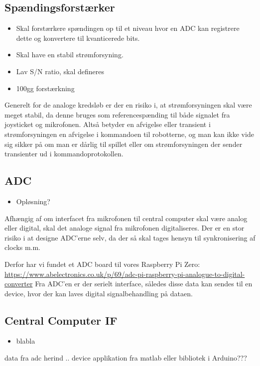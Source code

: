 \subsection{Spændingsforstærker}
\begin{itemize}
    \item Skal forstærkere spændingen op til et niveau hvor en ADC kan registrere dette og konvertere til kvanticerede bits.
    \item Skal have en stabil strømforsyning.
    \item Lav S/N ratio, \tbr skal defineres
    \item 100gg forstærkning \tbr
\end{itemize}\newline
Generelt for de analoge kredsløb er der en risiko i, at strømforsyningen skal være meget stabil, da denne bruges som referencespænding til både signalet fra joysticket og mikrofonen. Altså betyder en afvigelse eller transient i strømforsyningen en afvigelse i kommandoen til robotterne, og man kan ikke vide sig sikker på om man er dårlig til spillet eller om strømforsyningen der sender transienter ud i kommandoprotokollen. 


\subsection{ADC}
\begin{itemize}
    \item \tbr Opløsning?
\end{itemize}
\tbr Afhængig af om interfacet fra mikrofonen til central computer skal være analog eller digital, skal det analoge signal fra mikrofonen digitaliseres. 
Der er en stor risiko i at designe ADC'erne selv, da der så skal tages hensyn til synkronisering af clocks m.m. 

Derfor har vi fundet et ADC board til vores Raspberry Pi Zero: \url{https://www.abelectronics.co.uk/p/69/adc-pi-raspberry-pi-analogue-to-digital-converter}\newline
Fra ADC'en er der serielt interface, således disse data kan sendes til en device, hvor der kan laves digital signalbehandling på dataen. 

\subsection{Central Computer IF}
\begin{itemize}
    \item blabla
\end{itemize}
data fra adc herind .. device applikation fra matlab eller bibliotek i Arduino???

